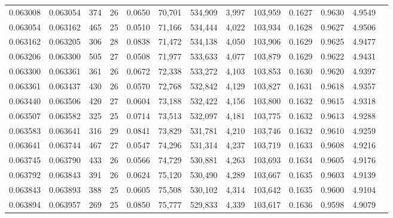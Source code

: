 \begin{tabular}{rrrrrrrrrrrrr}
0.063008 & 0.063054 & 374 &  26 &                                     0.0650 &  70,701 & 534,909 &   3,997 & 103,959 & 0.1627 & 0.9630 & 4.9549 \\
0.063054 & 0.063162 & 465 &  25 &                                     0.0510 &  71,166 & 534,444 &   4,022 & 103,934 & 0.1628 & 0.9627 & 4.9506 \\
0.063162 & 0.063205 & 306 &  28 &                                     0.0838 &  71,472 & 534,138 &   4,050 & 103,906 & 0.1629 & 0.9625 & 4.9477 \\
0.063206 & 0.063300 & 505 &  27 &                                     0.0508 &  71,977 & 533,633 &   4,077 & 103,879 & 0.1629 & 0.9622 & 4.9431 \\
0.063300 & 0.063361 & 361 &  26 &                                     0.0672 &  72,338 & 533,272 &   4,103 & 103,853 & 0.1630 & 0.9620 & 4.9397 \\
0.063361 & 0.063437 & 430 &  26 &                                     0.0570 &  72,768 & 532,842 &   4,129 & 103,827 & 0.1631 & 0.9618 & 4.9357 \\
0.063440 & 0.063506 & 420 &  27 &                                     0.0604 &  73,188 & 532,422 &   4,156 & 103,800 & 0.1632 & 0.9615 & 4.9318 \\
0.063507 & 0.063582 & 325 &  25 &                                     0.0714 &  73,513 & 532,097 &   4,181 & 103,775 & 0.1632 & 0.9613 & 4.9288 \\
0.063583 & 0.063641 & 316 &  29 &                                     0.0841 &  73,829 & 531,781 &   4,210 & 103,746 & 0.1632 & 0.9610 & 4.9259 \\
0.063641 & 0.063744 & 467 &  27 &                                     0.0547 &  74,296 & 531,314 &   4,237 & 103,719 & 0.1633 & 0.9608 & 4.9216 \\
0.063745 & 0.063790 & 433 &  26 &                                     0.0566 &  74,729 & 530,881 &   4,263 & 103,693 & 0.1634 & 0.9605 & 4.9176 \\
0.063792 & 0.063843 & 391 &  26 &                                     0.0624 &  75,120 & 530,490 &   4,289 & 103,667 & 0.1635 & 0.9603 & 4.9139 \\
0.063843 & 0.063893 & 388 &  25 &                                     0.0605 &  75,508 & 530,102 &   4,314 & 103,642 & 0.1635 & 0.9600 & 4.9104 \\
0.063894 & 0.063957 & 269 &  25 &                                     0.0850 &  75,777 & 529,833 &   4,339 & 103,617 & 0.1636 & 0.9598 & 4.9079 \\

\end{tabular}
